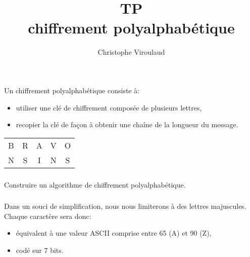 \documentclass[svgnames,11pt]{beamer}
\author[]{Christophe Viroulaud}
\title{TP\\chiffrement polyalphabétique}
\date{\framebox{\textbf{Algo 21}}}
\institute{Terminale - NSI}
\begin{document}
\begin{frame}
    \titlepage
\end{frame}
\begin{frame}
    \frametitle{}

    Un chiffrement polyalphabétique consiste à:
    \begin{itemize}
        \item utiliser une clé de chiffrement composée de plusieurs lettres,
        \item recopier la clé de façon à obtenir une chaîne de la longueur du message.
    \end{itemize}
    \begin{center}
        \begin{tabular}{*{5}{c}}
            B & R & A & V & O \\
            N & S & I & N & S \\
        \end{tabular}
    \end{center}

\end{frame}
\begin{frame}
    \frametitle{}

    \begin{framed}
        \centering Construire un algorithme de chiffrement polyalphabétique.
    \end{framed}

\end{frame}
\begin{frame}
    \frametitle{}

    \begin{aretenir}[Remarque]
        Dans un souci de simplification, nous nous limiterons à des lettres majuscules. Chaque caractère sera donc:
        \begin{itemize}
            \item équivalent à une valeur ASCII comprise entre 65 (A) et 90 (Z),
            \item codé sur 7 bits.
        \end{itemize}
    \end{aretenir}

\end{frame}
\end{document}
